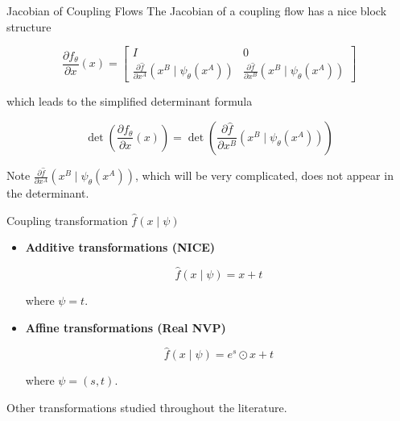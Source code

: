 \begin{frame}[allowframebreaks]

\begin{myconceptblock}{10.24}{Jacobian of Coupling Flows}
    The Jacobian of a coupling flow has a nice block structure

    $$
    \frac{\partial f_{\theta}}{\partial x}(x)=\left[\begin{array}{cc}
    I & 0 \\
    \frac{\partial \hat{f}}{\partial x^{A}}\left(x^{B} \mid \psi_{\theta}\left(x^{A}\right)\right) & \frac{\partial \hat{f}}{\partial x^{B}}\left(x^{B} \mid \psi_{\theta}\left(x^{A}\right)\right)
    \end{array}\right]
    $$

    which leads to the simplified determinant formula

    $$
    \operatorname{det}\left(\frac{\partial f_{\theta}}{\partial x}(x)\right)=\operatorname{det}\left(\frac{\partial \hat{f}}{\partial x^{B}}\left(x^{B} \mid \psi_{\theta}\left(x^{A}\right)\right)\right)
    $$

    Note $\frac{\partial \hat{f}}{\partial x^{A}}\left(x^{B} \mid \psi_{\theta}\left(x^{A}\right)\right)$, which will be very complicated, does not appear in the determinant.
\end{myconceptblock}

\end{frame}

\begin{frame}[allowframebreaks]

\begin{mydefinitionblock}{10.25}{Coupling transformation $\hat{f}(x \mid \psi)$}
    \begin{itemize}
        \item
        \textbf{Additive transformations (NICE)}

        $$
        \hat{f}(x \mid \psi)=x+t
        $$

        where $\psi=t$.
        \item
        \textbf{Affine transformations (Real NVP)}

        $$
        \hat{f}(x \mid \psi)=e^{s} \odot x+t
        $$

        where $\psi=(s, t)$.
    \end{itemize}

    Other transformations studied throughout the literature.
\end{mydefinitionblock}

\end{frame}


